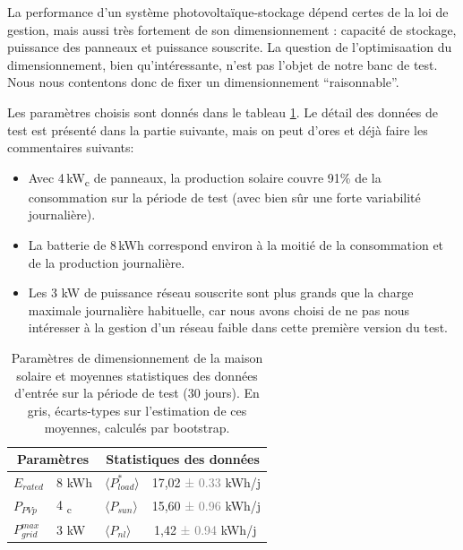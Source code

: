 \documentclass[a4paper,10pt,twocolumn]{article}
\providecommand{\avg}[1]{\langle#1\rangle}
\providecommand{\deta}[1]{\textcolor{gray}{#1}}
\newcommand\sub[1]{\textsubscript{#1}}
\begin{document}
La performance d'un système photovoltaïque-stockage dépend certes de la loi de gestion,
mais aussi très fortement de son dimensionnement :
capacité de stockage, puissance des panneaux et  puissance souscrite.
La question de l'optimisaation du dimensionnement, bien qu'intéressante,
n'est pas l'objet de notre banc de test.
Nous nous contentons donc de fixer un dimensionnement ``raisonnable''.

Les paramètres choisis sont donnés dans le tableau \ref{tab:dim_stats}.
Le détail des données de test est présenté dans la partie suivante,
mais on peut d'ores et déjà faire les commentaires suivants:

\begin{itemize}
 \item Avec 4\,kW\sub{c} de panneaux, la production solaire couvre 91\%
de la consommation sur la période de test (avec bien sûr une forte variabilité journalière).
 \item La batterie de 8\,kWh correspond environ à la moitié de la consommation
 et  de la production journalière.
 \item Les 3 kW de puissance réseau souscrite sont plus grands
 que la charge maximale journalière habituelle,
 car nous avons choisi de ne pas nous intéresser à la gestion d'un réseau faible
 dans cette première version du test.
\end{itemize}

\begin{table}[!h]
\renewcommand{\arraystretch}{1.2}

\caption{Paramètres de dimensionnement de la maison solaire
et moyennes statistiques des données d'entrée sur la période de test
(30 jours).
En gris, écarts-types sur l'estimation de ces moyennes,
calculés par bootstrap.}
\label{tab:dim_stats}

\noindent
\centering
  \begin{center}
    \begin{tabular}{l l l l}
      \toprule
      \multicolumn{2}{c}{Paramètres} & \multicolumn{2}{c}{Statistiques des données} \\
      \midrule
      $E_{rated}$       & 8 kWh  & $\avg{P_{load}^*}$ &    17,02 \deta{± 0.33} kWh/j\\
      $P_{PVp}$         & 4 \sub{c}  & $\avg{P_{sun}}$    &    15,60 \deta{± 0.96} kWh/j\\
      $P_{grid}^{max}$  & 3 kW   & $\avg{P_{nl}}$     & \;\,1,42 \deta{± 0.94} kWh/j\\
      \bottomrule
    \end{tabular}
  \end{center}
\end{table}
\end{document}
